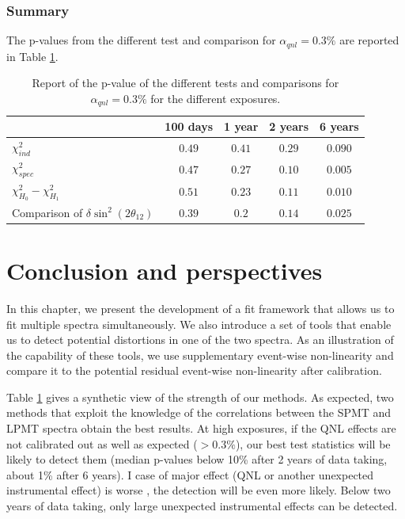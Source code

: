 \documentclass[../main.tex]{subfiles}
\begin{document}
\subsubsection{Summary}

The p-values from the different test and comparison for $\alpha_{qnl} = 0.3\%$ are reported in Table \ref{tab:joint_fit:results:p_value}.
\begin{table}[ht]
  \centering
  \begin{tabular}{l | c | c | c | c}
                                   & 100 days          & 1 year           & 2 years          & 6 years \\
                                   \hline
    $\chi^2_{ind}$                               & $0.49$  & $0.41 $ & $0.29$ & $0.090$ \\
    $\chi^2_{spec}$                              & $0.47$  & $0.27 $ & $\bm{0.10}$ & $\bm{0.005}$ \\
    $\chi^2_{H_0} - \chi^2_{H_1}$                & $0.51$  & $0.23 $ & $\bm{0.11}$ & $\bm{0.010}$ \\
    Comparison of $\delta \sin^2(2 \theta_{12})$ & $0.39$  & $0.2  $ & $0.14$ & $0.025$ \\
  \end{tabular}
  \caption{Report of the p-value of the different tests and comparisons for $\alpha_{qnl} = 0.3\%$ for the different exposures.}
  \label{tab:joint_fit:results:p_value}
\end{table}


%
%
%
%
%

\section{Conclusion and perspectives}
\label{sec:joint_fit:conclusion}

In this chapter, we present the development of a fit framework that allows us to fit multiple spectra simultaneously. We also introduce a set of tools that enable us to detect potential distortions in one of the two spectra. As an illustration of the capability of these tools, we use supplementary event-wise non-linearity and compare it to the potential residual event-wise non-linearity after calibration.

Table \ref{tab:joint_fit:results:p_value} gives a synthetic view of the strength of our methods. As expected, two methods that exploit the knowledge of the correlations between the SPMT and LPMT spectra obtain the best results. At high exposures, if the QNL effects are not calibrated out as well as expected ($>0.3\%$), our best test statistics will be likely to detect them (median p-values below 10\% after 2 years of data taking,  about 1\% after 6 years).
I case of major effect (QNL or another unexpected instrumental effect) is worse , the detection will be even more likely.  Below two years of data taking, only large unexpected instrumental effects can be detected.
\end{document}
